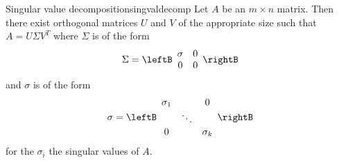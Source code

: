 \begin{theorem}{Singular value decomposition}{singvaldecomp}
Let $A$ be an $m\times n$ matrix. Then there exist
orthogonal matrices $U$ and $V$ of the appropriate size such that $A= U \Sigma V^T$ where $\Sigma$ is of the form
\[
\Sigma = 
\leftB 
\begin{array}{cc}
\sigma & 0 \\ 
0 & 0
\end{array}
\rightB
\]
and $\sigma $ is of the form 
\[
\sigma =\leftB 
\begin{array}{ccc}
\sigma _{1} &  & 0 \\ 
& \ddots &  \\ 
0 &  & \sigma _{k}
\end{array}
\rightB
\]
for the $\sigma _{i}$ the singular values of $A.$
\end{theorem}

